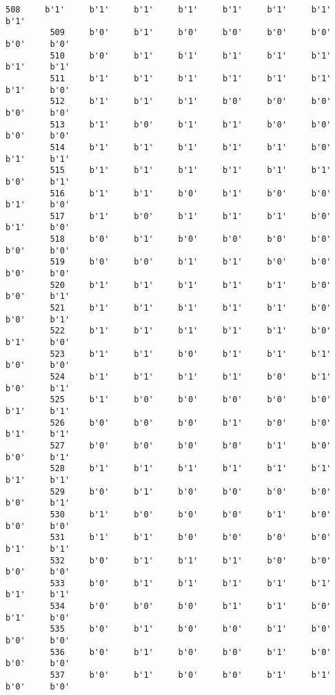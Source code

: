 \documentclass[11pt]{article}
\begin{document}
\begin{Verbatim}[commandchars=\\\{\}]
         508     b'1'     b'1'     b'1'     b'1'     b'1'     b'1'     b'1'     b'1'   
         509     b'0'     b'1'     b'0'     b'0'     b'0'     b'0'     b'0'     b'0'   
         510     b'0'     b'1'     b'1'     b'1'     b'1'     b'1'     b'1'     b'1'   
         511     b'1'     b'1'     b'1'     b'1'     b'1'     b'1'     b'1'     b'0'   
         512     b'1'     b'1'     b'1'     b'0'     b'0'     b'0'     b'0'     b'0'   
         513     b'1'     b'0'     b'1'     b'1'     b'0'     b'0'     b'0'     b'0'   
         514     b'1'     b'1'     b'1'     b'1'     b'1'     b'0'     b'1'     b'1'   
         515     b'1'     b'1'     b'1'     b'1'     b'1'     b'1'     b'0'     b'1'   
         516     b'1'     b'1'     b'0'     b'1'     b'0'     b'0'     b'1'     b'0'   
         517     b'1'     b'0'     b'1'     b'1'     b'1'     b'0'     b'1'     b'0'   
         518     b'0'     b'1'     b'0'     b'0'     b'0'     b'0'     b'0'     b'0'   
         519     b'0'     b'0'     b'1'     b'1'     b'0'     b'0'     b'0'     b'0'   
         520     b'1'     b'1'     b'1'     b'1'     b'1'     b'0'     b'0'     b'1'   
         521     b'1'     b'1'     b'1'     b'1'     b'1'     b'0'     b'0'     b'1'   
         522     b'1'     b'1'     b'1'     b'1'     b'1'     b'0'     b'1'     b'0'   
         523     b'1'     b'1'     b'0'     b'1'     b'1'     b'1'     b'0'     b'0'   
         524     b'1'     b'1'     b'1'     b'1'     b'0'     b'1'     b'0'     b'1'   
         525     b'1'     b'0'     b'0'     b'0'     b'0'     b'0'     b'1'     b'1'   
         526     b'0'     b'0'     b'0'     b'1'     b'0'     b'0'     b'1'     b'1'   
         527     b'0'     b'0'     b'0'     b'0'     b'1'     b'0'     b'0'     b'1'   
         528     b'1'     b'1'     b'1'     b'1'     b'1'     b'1'     b'1'     b'1'   
         529     b'0'     b'1'     b'0'     b'0'     b'0'     b'0'     b'0'     b'1'   
         530     b'1'     b'0'     b'0'     b'0'     b'1'     b'0'     b'0'     b'0'   
         531     b'1'     b'1'     b'0'     b'0'     b'0'     b'0'     b'1'     b'1'   
         532     b'0'     b'1'     b'1'     b'1'     b'0'     b'0'     b'0'     b'0'   
         533     b'0'     b'1'     b'1'     b'1'     b'1'     b'1'     b'1'     b'1'   
         534     b'0'     b'0'     b'0'     b'1'     b'1'     b'0'     b'1'     b'0'   
         535     b'0'     b'1'     b'0'     b'0'     b'1'     b'0'     b'0'     b'0'   
         536     b'0'     b'1'     b'0'     b'0'     b'1'     b'0'     b'0'     b'0'   
         537     b'0'     b'1'     b'0'     b'0'     b'1'     b'1'     b'0'     b'0'   

\end{Verbatim}
\end{document}
